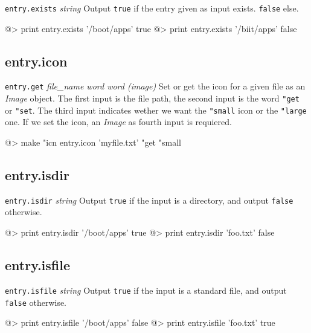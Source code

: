 {\tt entry.exists} {\it string}
\newline\newline
Output {\tt true} if the entry given as input exists. {\tt false} else.
\begin{verbatimtab}
@> print entry.exists '/boot/apps'
true
@> print entry.exists '/biit/apps'
false
\end{verbatimtab}
\cbend
\cbstart
\subsection*{entry.icon} 

{\tt entry.get} {\it file\_name word word (image)}
\newline\newline
Set or get the icon for a given file as an {\it Image} object. The first input is the file path, the second input is the word {\tt "get} or {\tt "set}. The third input indicates wether we want the {\tt "small} icon or the {\tt "large} one. If we set the icon, an {\it Image} as fourth input is requiered. 
\begin{verbatimtab}
@> make "icn entry.icon 'myfile.txt' "get "small
\end{verbatimtab}
\cbend

\subsection*{entry.isdir} 

{\tt entry.isdir} {\it string}
\newline\newline
Output {\tt true} if the input is a directory, and output {\tt false} otherwise.
\begin{verbatimtab}
@> print entry.isdir '/boot/apps'
true
@> print entry.isdir 'foo.txt'
false
\end{verbatimtab}

\subsection*{entry.isfile} 

{\tt entry.isfile} {\it string}
\newline\newline
Output {\tt true} if the input is a standard file, and output {\tt false} otherwise.
\begin{verbatimtab}
@> print entry.isfile '/boot/apps'
false
@> print entry.isfile 'foo.txt'
true
\end{verbatimtab}

